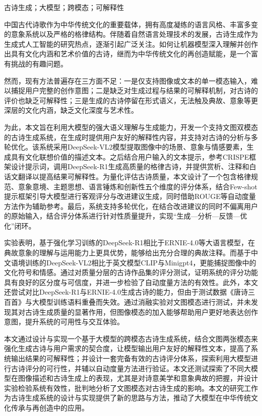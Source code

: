 
\begin{cnabstract}{古诗生成；大模型；跨模态；可解释性}
  
中国古代诗歌作为中华传统文化的重要载体，拥有高度凝练的语言风格、丰富多变的意象系统以及严格的格律结构。伴随着自然语言处理技术的发展，古诗生成作为生成式人工智能的研究热点，逐渐引起广泛关注。如何让机器模型深入理解并创作出具有文化内涵和艺术价值的古诗，继而为中华传统文化的再创造赋能，是一个富有挑战的有趣问题。

然而，现有方法普遍存在三方面不足：一是仅支持图像或文本的单一模态输入，难以捕捉用户完整的创作意图；二是缺乏对生成过程与结果的可解释机制，对古诗的评价也缺乏可解释性；三是生成的古诗停留在形式语义，无法触及典故、意象等更深层的文化内涵，缺乏文化深度与艺术性。

为此，本文旨在利用大模型的强大语义理解与生成能力，开发一个支持文图双模态的古诗生成系统，在生成时提供用户友好的解释性内容，并支持对古诗的分析与多轮优化。该系统采用DeepSeek-VL2模型提取图像中的场景、意象与情感要素，生成具有文化联想价值的描述文本。之后结合用户输入的文本提示，参考CRISPE框架设计提示词，调用DeepSeek-R1生成高质量的格律古诗，并提供赏析、注释和白话文翻译以提高结果可解释性。为量化评估古诗质量，本文设计了一个包含格律规范、意象意境、主题思想、语言锤炼和创新性五个维度的评分体系，结合Few-shot提示框架引导大模型进行客观评分与改进建议生成，同时借助ROUGE等自动度量方法作为辅助参考。最后，系统支持多轮优化，在结合改进建议的同时不偏离用户的原始输入，结合评分体系进行针对性质量提升，实现“生成—分析—反馈—优化”闭环。

实验表明，基于强化学习训练的DeepSeek-R1相比于ERNIE-4.0等大语言模型，在典故意象的理解与运用能力上更具优势，能够给出充分合理的典故注释。而基于中文语境训练的DeepSeek-VL2相比于英文模型CLIP与Minigpt4，更能捕捉图像中的文化符号和情感。通过对质量分层的古诗作品集的评分测试，证明系统的评分功能具有良好的区分度与可信度，并进一步检验了自动度量方法的有效性。此外，本文还尝试对比DeepSeek-R1与ERNIE-4.0生成古诗的能力，但由于测试数据《唐诗三百首》与大模型训练语料重叠而失效。通过消融实验对文图模态进行测试，并未发现其对古诗生成质量的显著作用，但图像模态的加入能够帮助用户更好地表达创作意图，提升系统的可用性与交互体验。

本文通过设计与实现一个基于大模型的跨模态古诗生成系统，结合文图两张模态来强化生成古诗与用户需求的契合度，让模型输出用户友好的解释性文本，提高了系统输出结果的可解释性；并设计一套完备有效的古诗评分体系，探索利用大模型进行古诗评分的可行性，并辅以自动度量方法进行验证。本文还测试探索了不同大模型在图像描述和古诗生成上的表现，尤其是对诗意美学和意象典故的把握，并设计实验检验系统有效性，批判地分析了文图模态对古诗生成的影响。本文的研究工作为古诗生成系统的设计与实现提供了新的思路与方法，推动了大模型在中华传统文化传承与再创造中的应用。



\end{cnabstract}

